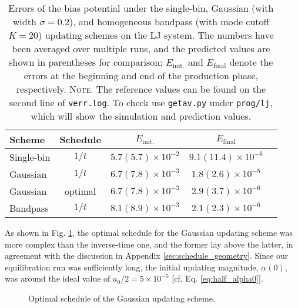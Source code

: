\documentclass[reprint, superscriptaddress, floatfix]{revtex4-1}
\newcommand{\note}[1]{{\color{DarkGreen}\footnotesize \textsc{Note.} #1}}
\newcommand{\Err}{E}
\begin{document}
\begin{table}[h]
  \caption{\label{tab:lj_error}
    Errors of the bias potential under
    the single-bin,
    Gaussian (with width $\sigma = 0.2$),
    and homogeneous bandpass (with mode cutoff $K = 20$)
    updating schemes
    on the LJ system.
    The numbers have been averaged over multiple runs,
    and the predicted values are shown in parentheses for comparison;
    $\Err_\mathrm{init.}$ and $\Err_\mathrm{final}$
    denote the errors at the beginning and end of the production phase, respectively.
    \note{The reference values can be found
    on the second line of \texttt{verr.log}.
    To check use \texttt{getav.py} under \texttt{prog/lj},
    which will show the simulation and prediction values.}%
  }
  \setlength{\tabcolsep}{2pt}
  \renewcommand\arraystretch{1.4}
  \begin{tabular} { l c c c c }
    \hline
    Scheme & Schedule &
    $\Err_\mathrm{init.}$ &
    $\Err_\mathrm{final}$
    \\
    \hline
    Single-bin & $1/t$
    & $5.7(5.7)\times10^{-2}$
    & $9.1(11.4)\times10^{-6}$
    \\
    Gaussian & $1/t$
    & $6.7(7.8)\times10^{-3}$
    & $1.8(2.6)\times10^{-5}$
    \\
    Gaussian & optimal
    & $6.7(7.8)\times10^{-3}$
    & $2.9(3.7)\times10^{-6}$
    \\
    Bandpass & $1/t$
    & $8.1(8.9)\times10^{-3}$
    & $2.1(2.3)\times10^{-6}$
    \\
    \hline
  \end{tabular}
\end{table}

As shown in Fig. \ref{fig:lj_alpha},
the optimal schedule for the Gaussian updating scheme
was more complex than the inverse-time one,
and the former lay above the latter,
in agreement with the discussion in Appendix \ref{sec:schedule_geometry}.
%
Since our equilibration run was sufficiently long,
the initial updating magnitude, $\alpha(0)$,
was around the ideal value of $a_0/2 = 5\times10^{-5}$
[cf. Eq. \eqref{eq:half_alpha0}].

\begin{figure}[h]\centering
  \caption{
    \label{fig:lj_alpha}
    Optimal schedule of the Gaussian updating scheme.
  }
\end{figure}
\end{document}
